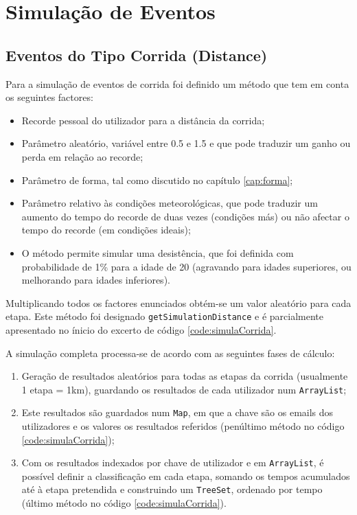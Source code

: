 \documentclass[a4paper,10pt]{report}
\begin{document}
\chapter{Simulação de Eventos}
\label{cap:simula}
\section{Eventos do Tipo Corrida (Distance)}
\label{sec:simulaCorrida}
Para a simulação de eventos de corrida foi definido um método que tem em conta os seguintes factores:
\begin{itemize}
 \item Recorde pessoal do utilizador para a distância da corrida;
 \item Parâmetro aleatório, variável entre 0.5 e 1.5 e que pode traduzir um ganho ou perda em relação ao recorde;
 \item Parâmetro de forma, tal como discutido no capítulo \ref{cap:forma};
 \item Parâmetro relativo às condições meteorológicas, que pode traduzir um aumento do tempo do recorde de duas vezes (condições más)
	  ou não afectar o tempo do recorde (em condições ideais);
 \item O método permite simular uma desistência, que foi definida com probabilidade de 1\% para a idade de 20 (agravando para idades superiores, 
	  ou melhorando para idades inferiores).
\end{itemize}
Multiplicando todos os factores enunciados obtém-se um valor aleatório para cada etapa.
Este método foi designado \verb!getSimulationDistance! e é parcialmente apresentado no ínicio do excerto de código \ref{code:simulaCorrida}.

A simulação completa processa-se de acordo com as seguintes fases de cálculo:
\begin{enumerate}
 \item Geração de resultados aleatórios para todas as etapas da corrida (usualmente 1 etapa = 1km), 
	  guardando os resultados de cada utilizador num \verb!ArrayList!;
 \item Este resultados são guardados num \verb!Map!, em que a chave são os emails dos utilizadores e os valores os resultados referidos 
	  (penúltimo método no código \ref{code:simulaCorrida});
 \item Com os resultados indexados por chave de utilizador e em \verb!ArrayList!, é possível definir a classificação em cada etapa,
	  somando os tempos acumulados até à etapa pretendida e construindo um \verb!TreeSet!, ordenado por tempo
	  (último método no código \ref{code:simulaCorrida}).
\end{enumerate}
\end{document}
